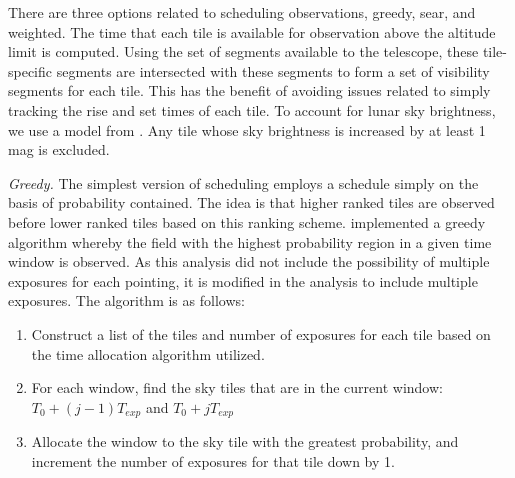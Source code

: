 \documentclass[twocolumn]{aastex61}
\begin{document}
There are three options related to scheduling observations, greedy, sear, and weighted.
The time that each tile is available for observation above the altitude limit is computed.
Using the set of segments available to the telescope, these tile-specific segments  are intersected with these segments to form a set of visibility segments for each tile.
This has the benefit of avoiding issues related to simply tracking the rise and set times of each tile.
To account for lunar sky brightness, we use a model from \cite{CoSt2016b}. 
Any tile whose sky brightness is increased by at least 1\,mag is excluded.

\emph{Greedy.} The simplest version of scheduling employs a schedule simply on the basis of probability contained. The idea is that higher ranked tiles are observed before lower ranked tiles based on this ranking scheme. \cite{RaSi2017} implemented a greedy algorithm whereby the field with the highest probability region in a given time window is observed. As this analysis did not include the possibility of multiple exposures for each pointing, it is modified in the analysis to include multiple exposures. The algorithm is as follows:

\begin{enumerate}
\item Construct a list of the tiles and number of exposures for each tile based on the time allocation algorithm utilized.
\item For each window, find the sky tiles that are in the current window: $T_0 + (j-1) T_{exp}$ and $T_0 + j T_{exp}$
\item Allocate the window to the sky tile with the greatest probability, and increment the number of exposures for that tile down by 1.
\end{enumerate}
\end{document}
